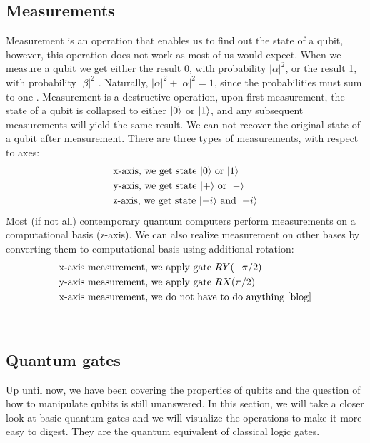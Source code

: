 \subsection{Measurements}
Measurement is an operation that enables us to find out the state of a qubit, however, this operation does not work as most of us would expect. When we measure a qubit we get either the result 0, with probability $\lvert \alpha \rvert^2$, or the result 1, with probability $\lvert \beta \rvert^2$ \cite{qc}. Naturally, $\lvert \alpha \rvert^2 + \lvert \alpha \rvert^2 = 1$, since the probabilities must sum to one \cite{qc}. Measurement is a destructive operation, upon first measurement, the state of a qubit is collapsed to either $\lvert0\rangle$ or $\lvert1\rangle$, and any subsequent measurements will yield the same result. We can not recover the original state of a qubit after measurement. There are three types of measurements, with respect to axes:
\begin{align*}
&\text{x-axis, we get state }\lvert0\rangle \text{ or }\lvert1\rangle\\
&\text{y-axis, we get state }\lvert+\rangle \text{ or }\lvert-\rangle\\
&\text{z-axis, we get state }\lvert-i\rangle \text{ and }\lvert+i\rangle
\end{align*}
Most (if not all) contemporary quantum computers perform measurements on a computational basis (z-axis). We can also realize measurement on other bases by converting them to computational basis using additional rotation:
\begin{align*}
    &\text{x-axis measurement, we apply gate } RY(-\pi/2) \\
    &\text{y-axis measurement, we apply gate } RX(\pi/2) \\
    &\text{x-axis measurement, we do not have to do anything \cite{blog}}
\end{align*}

\\

\subsection{Quantum gates}
Up until now, we have been covering the properties of qubits and the question of how to manipulate qubits is still unanswered. In this section, we will take a closer look at basic quantum gates and we will visualize the operations to make it more easy to digest. They are the quantum equivalent of classical logic gates.


